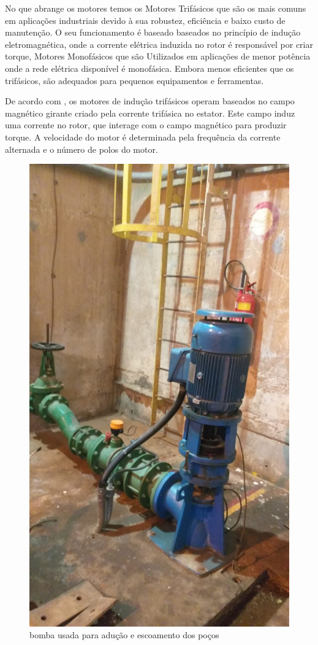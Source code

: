 No que abrange os motores temos os Motores Trifásicos que são os mais comuns em aplicações industriais devido à sua robustez, eficiência e baixo custo de manutenção. O seu funcionamento é baseado baseados no princípio de indução eletromagnética, onde a corrente elétrica induzida no rotor é responsável por criar torque, Motores Monofásicos que são Utilizados em aplicações de menor potência onde a rede elétrica disponível é monofásica. Embora menos eficientes que os trifásicos, são adequados para pequenos equipamentos e ferramentas.  

De acordo com \cite{chapman}, os motores de indução trifásicos operam baseados no campo magnético girante criado pela corrente trifásica no estator. Este campo induz uma corrente no rotor, que interage com o campo magnético para produzir torque. A velocidade do motor é determinada pela frequência da corrente alternada e o número de polos do motor.

\begin{figure}[h]
	\centering
	\label{fig:bombas}
		\includegraphics[keepaspectratio=true,scale=0.15]{figuras/bomba.jpeg}
	\caption{bomba usada para adução e escoamento dos poços}
\end{figure}


